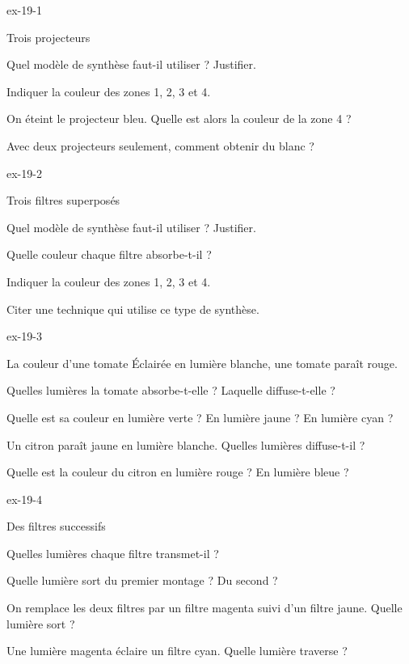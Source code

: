 \begin{blocLivre}{ex-19-1}
\begin{exercice}[1]{Trois projecteurs}
\begin{questions}
\item Quel modèle de synthèse faut-il utiliser ? Justifier.
\item Indiquer la couleur des zones 1, 2, 3 et 4.
\item On éteint le projecteur bleu. Quelle est alors la couleur de la zone 4 ?
\item Avec deux projecteurs seulement, comment obtenir du blanc ?
\end{questions}
\end{exercice}
\end{blocLivre}
\begin{blocLivre}{ex-19-2}
\begin{exercice}[1]{Trois filtres superposés}
\begin{questions}
\item Quel modèle de synthèse faut-il utiliser ? Justifier.
\item Quelle couleur chaque filtre absorbe-t-il ?
\item Indiquer la couleur des zones 1, 2, 3 et 4.
\item Citer une technique qui utilise ce type de synthèse.
\end{questions}
\end{exercice}
\end{blocLivre}
\begin{blocLivre}{ex-19-3}
\begin{exercice}[1]{La couleur d'une tomate}
Éclairée en lumière blanche, une tomate paraît rouge.
\begin{questions}
\item Quelles lumières la tomate absorbe-t-elle ? Laquelle diffuse-t-elle ?
\item Quelle est sa couleur en lumière verte ? En lumière jaune ? En lumière cyan ?
\item Un citron paraît jaune en lumière blanche. Quelles lumières diffuse-t-il ?
\item Quelle est la couleur du citron en lumière rouge ? En lumière bleue ?
\end{questions}
\end{exercice}
\end{blocLivre}
\begin{blocLivre}{ex-19-4}
\begin{exercice}[1]{Des filtres successifs}
\begin{questions}
\item Quelles lumières chaque filtre transmet-il ?
\item Quelle lumière sort du premier montage ? Du second ?
\item On remplace les deux filtres par un filtre magenta suivi d'un filtre jaune. Quelle lumière sort ?
\item Une lumière magenta éclaire un filtre cyan. Quelle lumière traverse ?
\end{questions}
\end{exercice}
\end{blocLivre}

